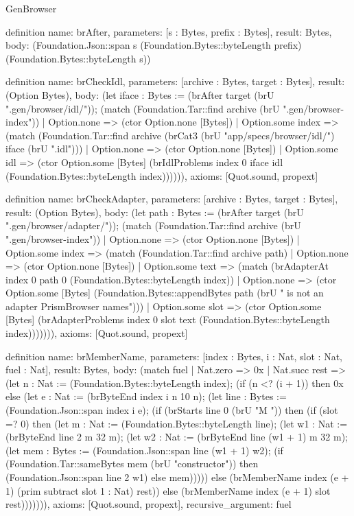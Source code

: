 \begin{lexlean}{GenBrowser}
\begin{semanticmodule}
{{definition{
  name: brAfter,
  parameters: [s : Bytes, prefix : Bytes],
  result: Bytes,
  body: (Foundation.Json::span s (Foundation.Bytes::byteLength prefix) (Foundation.Bytes::byteLength s))
}

definition{
  name: brCheckIdl,
  parameters: [archive : Bytes, target : Bytes],
  result: (Option Bytes),
  body: (let iface : Bytes := (brAfter target (brU ".gen/browser/idl/")); (match (Foundation.Tar::find archive (brU ".gen/browser-index"))
    | Option.none => (ctor Option.none [Bytes])
    | Option.some index => (match (Foundation.Tar::find archive (brCat3 (brU "app/specs/browser/idl/") iface (brU ".idl")))
      | Option.none => (ctor Option.none [Bytes])
      | Option.some idl => (ctor Option.some [Bytes] (brIdlProblems index 0 iface idl (Foundation.Bytes::byteLength index)))))),
  axioms: [Quot.sound, propext]
}

definition{
  name: brCheckAdapter,
  parameters: [archive : Bytes, target : Bytes],
  result: (Option Bytes),
  body: (let path : Bytes := (brAfter target (brU ".gen/browser/adapter/")); (match (Foundation.Tar::find archive (brU ".gen/browser-index"))
    | Option.none => (ctor Option.none [Bytes])
    | Option.some index => (match (Foundation.Tar::find archive path)
      | Option.none => (ctor Option.none [Bytes])
      | Option.some text => (match (brAdapterAt index 0 path 0 (Foundation.Bytes::byteLength index))
        | Option.none => (ctor Option.some [Bytes] (Foundation.Bytes::appendBytes path (brU " is not an adapter PrismBrowser names\n")))
        | Option.some slot => (ctor Option.some [Bytes] (brAdapterProblems index 0 slot text (Foundation.Bytes::byteLength index))))))),
  axioms: [Quot.sound, propext]
}

definition{
  name: brMemberName,
  parameters: [index : Bytes, i : Nat, slot : Nat, fuel : Nat],
  result: Bytes,
  body: (match fuel
    | Nat.zero => 0x
    | Nat.succ rest => (let n : Nat := (Foundation.Bytes::byteLength index); (if (n <? (i + 1)) then 0x else (let e : Nat := (brByteEnd index i n 10 n); (let line : Bytes := (Foundation.Json::span index i e); (if (brStarts line 0 (brU "M ")) then (if (slot =? 0) then (let m : Nat := (Foundation.Bytes::byteLength line); (let w1 : Nat := (brByteEnd line 2 m 32 m); (let w2 : Nat := (brByteEnd line (w1 + 1) m 32 m); (let mem : Bytes := (Foundation.Json::span line (w1 + 1) w2); (if (Foundation.Tar::sameBytes mem (brU "constructor")) then (Foundation.Json::span line 2 w1) else mem))))) else (brMemberName index (e + 1) (prim subtract slot 1 : Nat) rest)) else (brMemberName index (e + 1) slot rest))))))),
  axioms: [Quot.sound, propext],
  recursive_argument: fuel
}

}}
\end{semanticmodule}
\end{lexlean}
